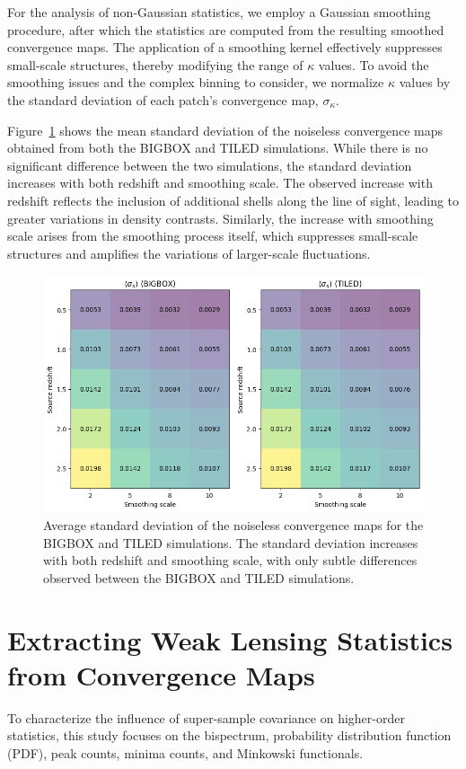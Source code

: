 For the analysis of non-Gaussian statistics, we employ a Gaussian smoothing procedure, after which the statistics are computed from the resulting smoothed convergence maps. The application of a smoothing kernel effectively suppresses small-scale structures, thereby modifying the range of $\kappa$ values. To avoid the smoothing issues and the complex binning to consider, we normalize $\kappa$ values by the standard deviation of each patch's convergence map, $\sigma_{\kappa}$. 

Figure~\ref{fig:avg_sigma0} shows the mean standard deviation of the noiseless convergence maps obtained from both the BIGBOX and TILED simulations. While there is no significant difference between the two simulations, the standard deviation increases with both redshift and smoothing scale. The observed increase with redshift reflects the inclusion of additional shells along the line of sight, leading to greater variations in density contrasts. Similarly, the increase with smoothing scale arises from the smoothing process itself, which suppresses small-scale structures and amplifies the variations of larger-scale fluctuations.

\begin{figure}[ht]
    \centering
    \includegraphics[width=\textwidth]{figures/avg_sigma0.png}
    \caption[Average standard deviation of noiseless convergence maps]{Average standard deviation of the noiseless convergence maps for the BIGBOX and TILED simulations. The standard deviation increases with both redshift and smoothing scale, with only subtle differences observed between the BIGBOX and TILED simulations.}
    \label{fig:avg_sigma0}
\end{figure}

\section{Extracting Weak Lensing Statistics from Convergence Maps}
To characterize the influence of super-sample covariance on higher-order statistics, this study focuses on the bispectrum, probability distribution function (PDF), peak counts, minima counts, and Minkowski functionals.

